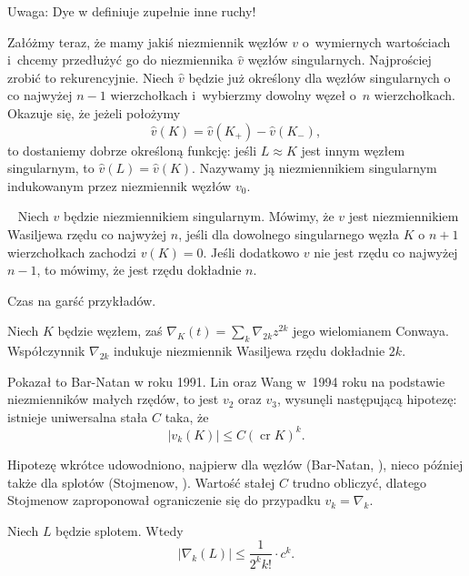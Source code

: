 Uwaga: Dye w \cite{dye16} definiuje zupełnie inne ruchy!

Załóżmy teraz, że mamy jakiś niezmiennik węzłów $v$ o~wymiernych wartościach i~chcemy przedłużyć go do niezmiennika $\hat v$ węzłów singularnych.
Najprościej zrobić to rekurencyjnie.
Niech $\hat v$ będzie już określony dla węzłów singularnych o co najwyżej $n - 1$ wierzchołkach i~wybierzmy dowolny węzeł o~$n$ wierzchołkach.
Okazuje się, że jeżeli położymy
\begin{equation}
    \hat v(K) = \hat v(K_+) - \hat v(K_-),
\end{equation}
to dostaniemy dobrze określoną funkcję: jeśli $L \approx K$ jest innym węzłem singularnym, to $\hat v(L) = \hat v(K)$.
Nazywamy ją niezmiennikiem singularnym indukowanym przez niezmiennik węzłów $v_0$.

\begin{definition}\
    \label{def:vassiliev_order}
    Niech $v$ będzie niezmiennikiem singularnym.
    Mówimy, że $v$ jest niezmiennikiem Wasiljewa rzędu co najwyżej $n$, jeśli dla dowolnego singularnego węzła $K$ o $n + 1$ wierzchołkach zachodzi $v(K) = 0$.
    Jeśli dodatkowo $v$ nie jest rzędu co najwyżej $n - 1$, to mówimy, że jest rzędu dokładnie $n$.
\end{definition}

Czas na garść przykładów.

\begin{example}
    Niech $K$ będzie węzłem, zaś $\nabla_K(t) = \sum_k \nabla_{2k} z^{2k}$ jego wielomianem Conwaya.
    Współczynnik $\nabla_{2k}$ indukuje niezmiennik Wasiljewa rzędu dokładnie $2k$.
\end{example}

Pokazał to Bar-Natan w roku 1991.
Lin oraz Wang w~1994 roku na podstawie niezmienników małych rzędów, to jest $v_2$ oraz $v_3$, wysunęli następującą hipotezę: istnieje uniwersalna stała $C$ taka, że
\begin{equation}
    |v_k(K)| \le C (\operatorname{cr} K)^k.
\end{equation}

Hipotezę wkrótce udowodniono, najpierw dla węzłów (Bar-Natan, \cite{barnatan95}), nieco później także dla splotów (Stojmenow, \cite{stoimenow_01}).
Wartość stałej $C$ trudno obliczyć, dlatego Stojmenow zaproponował ograniczenie się do przypadku $v_k = \nabla_k$.

\begin{conjecture}
    Niech $L$ będzie splotem.
    Wtedy
    \begin{equation}
        |\nabla_k(L)| \le \frac{1}{2^kk!} \cdot c^k.
    \end{equation}
\end{conjecture}

